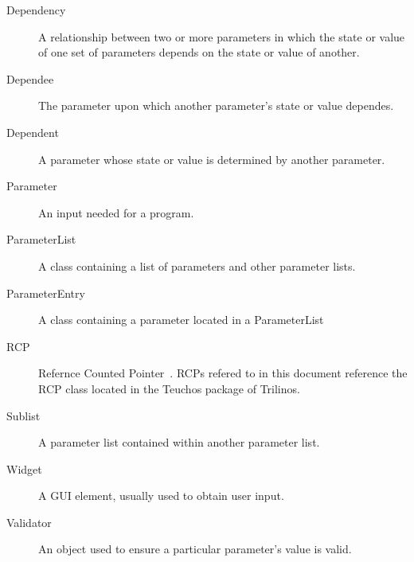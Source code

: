     \begin{description}
	\item[Dependency]
	    A relationship between two or more parameters in which the state
		or value of one set of parameters depends on the state or value of
		another.
	\item[Dependee]
		The parameter upon which another parameter's state or value dependes.
	\item[Dependent]
		A parameter whose state or value is determined by another
		parameter.
	\item[Parameter]
	    An input needed for a program.
	\item[ParameterList]
	    A class containing a list of parameters and other parameter lists.
	\item[ParameterEntry]
		A class containing a parameter located in a ParameterList
	\item[RCP]
	    Refernce Counted Pointer~\cite{RCP}. RCPs refered to in this document reference the
		RCP class located in the Teuchos package of Trilinos.
	\item[Sublist]
	    A parameter list contained within another parameter list.
	\item[Widget]
		A GUI element, usually used to obtain user input.
	\item[Validator]
		An object used to ensure a particular parameter's value is valid.
    \end{description}


